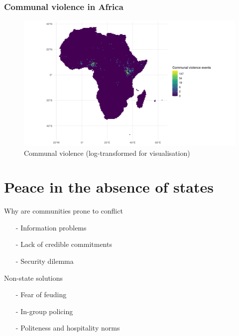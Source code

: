 \documentclass{beamer}
\begin{document}
\begin{frame}
\frametitle{Communal violence in Africa}
\begin{figure}[htpb]
	\centering
	\includegraphics[width=\linewidth]{../R/Output/logOrg3.pdf}
	\caption{Communal violence (log-transformed for visualisation)}
	\label{org3}
\end{figure}
\end{frame}

\section{Peace in the absence of states}

\begin{frame}{Why are communities prone to conflict}

\begin{itemize}
	\item[-] Information problems \pause
	\item[-] Lack of credible commitments \pause
	\item[-] Security dilemma 
\end{itemize}	

\end{frame}

\begin{frame}{Non-state solutions}

	\begin{itemize}
		\item[-] Fear of feuding \pause
		\item[-] In-group policing \pause
		\item[-] Politeness and hospitality norms
	\end{itemize}

\end{frame}
\end{document}
